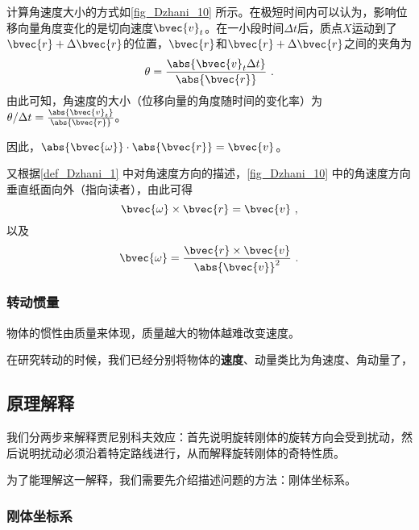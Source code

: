 计算角速度大小的方式如\autoref{fig_Dzhani_10} 所示。在极短时间内可以认为，影响位移向量角度变化的是切向速度$\bvec{v}_t$。在一小段时间$\Delta t$后，质点$X$运动到了$\bvec{r}+\Delta \bvec{r}$的位置，$\bvec{r}$和$\bvec{r}+\Delta \bvec{r}$之间的夹角为
\begin{equation}
\theta = \frac{\abs{\bvec{v}_t \Delta t}}{\abs{\bvec{r}}}~. 
\end{equation}
由此可知，角速度的大小（位移向量的角度随时间的变化率）为$\theta/\Delta t = \frac{\abs{\bvec{v}_t}}{\abs{\bvec{r}}}$。

因此，$\abs{\bvec{\omega}}\cdot\abs{\bvec{r}}=\bvec{v}$。

又根据\autoref{def_Dzhani_1} 中对角速度方向的描述，\autoref{fig_Dzhani_10} 中的角速度方向垂直纸面向外（指向读者），由此可得
\begin{equation}
\bvec{\omega}\times\bvec{r} = \bvec{v}~, 
\end{equation}
以及
\begin{equation}
\bvec{\omega} = \frac{\bvec{r}\times\bvec{v}}{\abs{\bvec{v}}^2}~. 
\end{equation}





\subsubsection{转动惯量}



物体的惯性由质量来体现，质量越大的物体越难改变速度。


在研究转动的时候，我们已经分别将物体的\textbf{速度}、动量类比为角速度、角动量了，







\subsection{原理解释}

我们分两步来解释贾尼别科夫效应：首先说明旋转刚体的旋转方向会受到扰动，然后说明扰动必须沿着特定路线进行，从而解释旋转刚体的奇特性质。

为了能理解这一解释，我们需要先介绍描述问题的方法：刚体坐标系。

\subsubsection{刚体坐标系}



